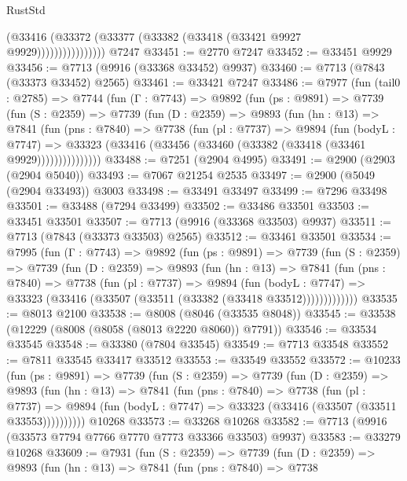 \begin{lexlean}{RustStd}
\begin{coremodule}
                        (@33416 (@33372 (@33377 (@33382 (@33418 (@33421 @9927 @9929))))))))))))))))
    @7247
@33451 := @2770 @7247
@33452 := @33451 @9929
@33456 := @7713 (@9916 (@33368 @33452) @9937)
@33460 := @7713 (@7843 (@33373 @33452) @2565)
@33461 := @33421 @7247
@33486 := @7977
    (fun (tail0 : @2785) =>
    @7744
      (fun (Γ : @7743) =>
      @9892
        (fun (ps : @9891) =>
        @7739
          (fun (S : @2359) =>
          @7739
            (fun (D : @2359) =>
            @9893
              (fun (hn : @13) =>
              @7841
                (fun (pns : @7840) =>
                @7738
                  (fun (pl : @7737) =>
                  @9894
                    (fun (bodyL : @7747) =>
                    @33323 (@33416 (@33456 (@33460 (@33382 (@33418 (@33461 @9929)))))))))))))))
@33488 := @7251 (@2904 @4995)
@33491 := @2900 (@2903 (@2904 @5040))
@33493 := @7067 @21254 @2535
@33497 := @2900 (@5049 (@2904 @33493)) @3003
@33498 := @33491 @33497
@33499 := @7296 @33498
@33501 := @33488 (@7294 @33499)
@33502 := @33486 @33501
@33503 := @33451 @33501
@33507 := @7713 (@9916 (@33368 @33503) @9937)
@33511 := @7713 (@7843 (@33373 @33503) @2565)
@33512 := @33461 @33501
@33534 := @7995
    (fun (Γ : @7743) =>
    @9892
      (fun (ps : @9891) =>
      @7739
        (fun (S : @2359) =>
        @7739
          (fun (D : @2359) =>
          @9893
            (fun (hn : @13) =>
            @7841
              (fun (pns : @7840) =>
              @7738
                (fun (pl : @7737) =>
                @9894
                  (fun (bodyL : @7747) =>
                  @33323 (@33416 (@33507 (@33511 (@33382 (@33418 @33512)))))))))))))
@33535 := @8013 @2100
@33538 := @8008 (@8046 (@33535 @8048))
@33545 := @33538 (@12229 (@8008 (@8058 (@8013 @2220 @8060)) @7791))
@33546 := @33534 @33545
@33548 := @33380 (@7804 @33545)
@33549 := @7713 @33548
@33552 := @7811 @33545 @33417 @33512
@33553 := @33549 @33552
@33572 := @10233
    (fun (ps : @9891) =>
    @7739
      (fun (S : @2359) =>
      @7739
        (fun (D : @2359) =>
        @9893
          (fun (hn : @13) =>
          @7841
            (fun (pns : @7840) =>
            @7738
              (fun (pl : @7737) =>
              @9894 (fun (bodyL : @7747) => @33323 (@33416 (@33507 (@33511 @33553))))))))))
    @10268
@33573 := @33268 @10268
@33582 := @7713 (@9916 (@33573 @7794 @7766 @7770 @7773 @33366 @33503) @9937)
@33583 := @33279 @10268
@33609 := @7931
    (fun (S : @2359) =>
    @7739
      (fun (D : @2359) =>
      @9893
        (fun (hn : @13) =>
        @7841
          (fun (pns : @7840) =>
          @7738

\end{coremodule}
\end{lexlean}
